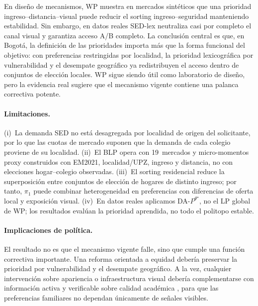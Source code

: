 \documentclass[12pt,a4paper]{article}
\begin{document}
En diseño de mecanismos, WP muestra en mercados sintéticos que una prioridad
ingreso--distancia--visual puede reducir el sorting ingreso--seguridad manteniendo
estabilidad. Sin embargo, en datos reales SED-lex neutraliza casi por completo el
canal visual y garantiza acceso A/B completo. La conclusión central es que, en
Bogotá, la definición de las prioridades importa más que la forma funcional del objetivo: 
con preferencias restringidas por localidad, la prioridad lexicográfica por vulnerabilidad y el
desempate geográfico ya redistribuyen el acceso dentro de conjuntos de elección
locales. WP sigue siendo útil como laboratorio de diseño, pero la evidencia real
sugiere que el mecanismo vigente contiene una palanca correctiva potente.

\paragraph{Limitaciones.}
(i)~La demanda SED no está desagregada por localidad de origen del solicitante, por
lo que las cuotas de mercado suponen que la demanda de cada colegio proviene de su
localidad. (ii)~El BLP opera con 19~mercados y micro-momentos proxy construidos
con EM2021, localidad/UPZ, ingreso y distancia, no con elecciones hogar--colegio
observadas. (iii)~El sorting residencial reduce la superposición entre conjuntos
de elección de hogares de distinto ingreso; por tanto, $\pi_1$ puede combinar
heterogeneidad en preferencias con diferencias de oferta local y exposición
visual. (iv)~En datos reales aplicamos DA-$P^{\theta^\star}$, no el LP global de
WP; los resultados evalúan la prioridad aprendida, no todo el politopo estable.

\paragraph{Implicaciones de política.}
El resultado no es que el mecanismo vigente falle, sino que cumple una función
correctiva importante. Una reforma orientada a equidad debería preservar la
prioridad por vulnerabilidad y el desempate geográfico. A la vez, cualquier
intervención sobre apariencia o infraestructura visual debería complementarse con
información activa y verificable sobre calidad académica
\citep{HastingsWeinstein2008,Allende2019}, para que las preferencias familiares
no dependan únicamente de señales visibles.


\newpage

\end{document}
